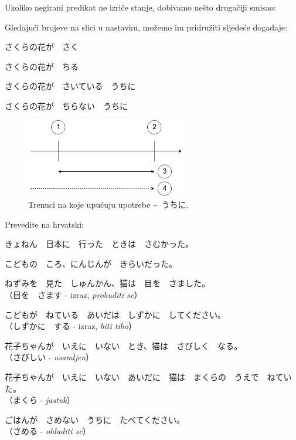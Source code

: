 	\noindent
	Ukoliko negirani predikat ne izriče stanje, dobivamo nešto drugačiji smisao:
	
	\begin{reibun}
	\end{reibun}

	
	Gledajući brojeve na slici u nastavku, možemo im pridružiti sljedeće događaje:
	
	\begin{hyou}
		\item {} さくらの花が　さく
		\item {} さくらの花が　ちる
		\item {} さくらの花が　さいている　うちに
		\item {} さくらの花が　ちらない　うちに
	\end{hyou}
	
	\begin{figure}[h]
		\centering
		\includegraphics[width=200pt]{img/vrem_1}
		\caption{Trenuci na koje upućuju upotrebe \textasciitilde~うちに.}
	\end{figure}

	
	\begin{mondai}{Prevedite na hrvatski:}
		\item きょねん　日本に　行った　ときは　さむかった。
		\item こどもの　ころ、にんじんが　きらいだった。
		\item ねずみを　見た　しゅんかん、猫は　目を　さました。\\（目を　さます - izraz, \textit{probuditi se}）
		\item こどもが　ねている　あいだは　しずかに　してください。\\（しずかに　する - izraz, \textit{biti tiho}）
		\item 花子ちゃんが　いえに　いない　とき、猫は　さびしく　なる。\\（さびしい - \textit{usamljen}）
		\item 花子ちゃんが　いえに　いない　あいだに　猫は　まくらの　うえで　ねていた。\\（まくら - \textit{jastuk}）
		\item ごはんが　さめない　うちに　たべてください。\\（さめる - \textit{ohladiti se}）
	\end{mondai}

